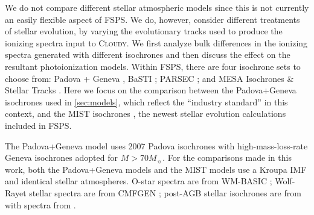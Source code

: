 \documentclass[linenumbers, tighten, trackchanges]{aastex61}%
\newcommand{\Sec}[1]{\autoref{sec:#1}}
\newcommand{\FSPS}{{\sc FSPS}\xspace}
\newcommand{\Cloudy}{\textsc{Cloudy}\xspace}
\begin{document}
We do not compare different stellar atmospheric models since this is not currently an easily flexible aspect of \FSPS. We do, however, consider different treatments of stellar evolution, by varying the evolutionary tracks used to produce the ionizing spectra input to \Cloudy. We first analyze bulk differences in the ionizing spectra generated with different isochrones and then discuss the effect on the resultant photoionization models. Within \FSPS, there are four isochrone sets to choose from: Padova \citep{Bertelli94, Girardi00, Marigo08} + Geneva \citep{Schaller92, Meynet00}, BaSTI \citep{Pietrinferni, Cordier07}; PARSEC \citep{Bressan12}; and MESA Isochrones \& Stellar Tracks \citep[MIST,][]{Dotter16, Choi16}. Here we focus on the comparison between the Padova+Geneva isochrones used in \Sec{models}, which reflect the ``industry standard'' in this context, and the MIST isochrones \citep[MIST,][]{Dotter16, Choi16}, the newest stellar evolution calculations included in \FSPS.

The Padova+Geneva model uses 2007 Padova isochrones with high-mass-loss-rate Geneva isochrones adopted for $M > 70 M_{\sun}$. For the comparisons made in this work, both the Padova+Geneva models and the MIST models use a Kroupa IMF and identical stellar atmospheres. O-star spectra are from WM-BASIC \citep[][updates from Eldridge et al., \emph{in prep}]{Pauldrach01}; Wolf-Rayet stellar spectra are from CMFGEN \citep{HillierMiller}; post-AGB stellar isochrones are from \citep{Vassiliadis} with spectra from \citep{Rauch03}.
\end{document}
